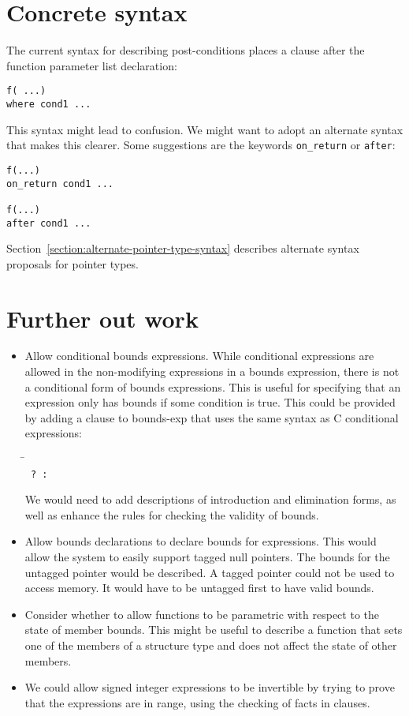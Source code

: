 \section{Concrete syntax}
 
The current syntax for describing post-conditions places a 
clause after the function parameter list declaration:

\begin{verbatim}
f( ...)
where cond1 ...
\end{verbatim}

This syntax might lead to confusion. We might want to adopt an alternate
syntax that makes this clearer. Some suggestions are the keywords
\texttt{on\_return} or \texttt{after}:

\begin{verbatim}
f(...)
on_return cond1 ...

f(...)
after cond1 ...
\end{verbatim}

Section~\ref{section:alternate-pointer-type-syntax} describes alternate
syntax proposals for pointer types.

\section{Further out work}
\begin{itemize}
\item Allow conditional bounds expressions.   While conditional
expressions are allowed in the non-modifying expressions in a bounds expression, 
there is not a conditional form of bounds expressions.  This is useful for
specifying that an expression only has bounds if some condition is true.
This could be provided by adding a clause to bounds-exp that uses the
same syntax as C conditional expressions:
\begin{tabbing}
\= \\
\>\texttt{ ?  : }
\end{tabbing}

We would need to add descriptions of introduction and elimination
forms, as well as enhance the rules for checking the validity of bounds.

\item Allow bounds declarations to declare bounds for expressions.
This would allow the system to easily support tagged null pointers.
The bounds for the untagged pointer would be described. 
A tagged pointer could not be used to access memory.  It would have to be
untagged first  to have valid bounds.

\item Consider whether to allow functions to be
parametric with respect to the state of member bounds. This might be
useful to describe a function that sets one of the members of a
structure type and does not affect the state of other members.

\item We could allow signed integer expressions to be invertible
by trying to prove that the expressions are in range, using the
checking of facts in  clauses.
\end{itemize}

